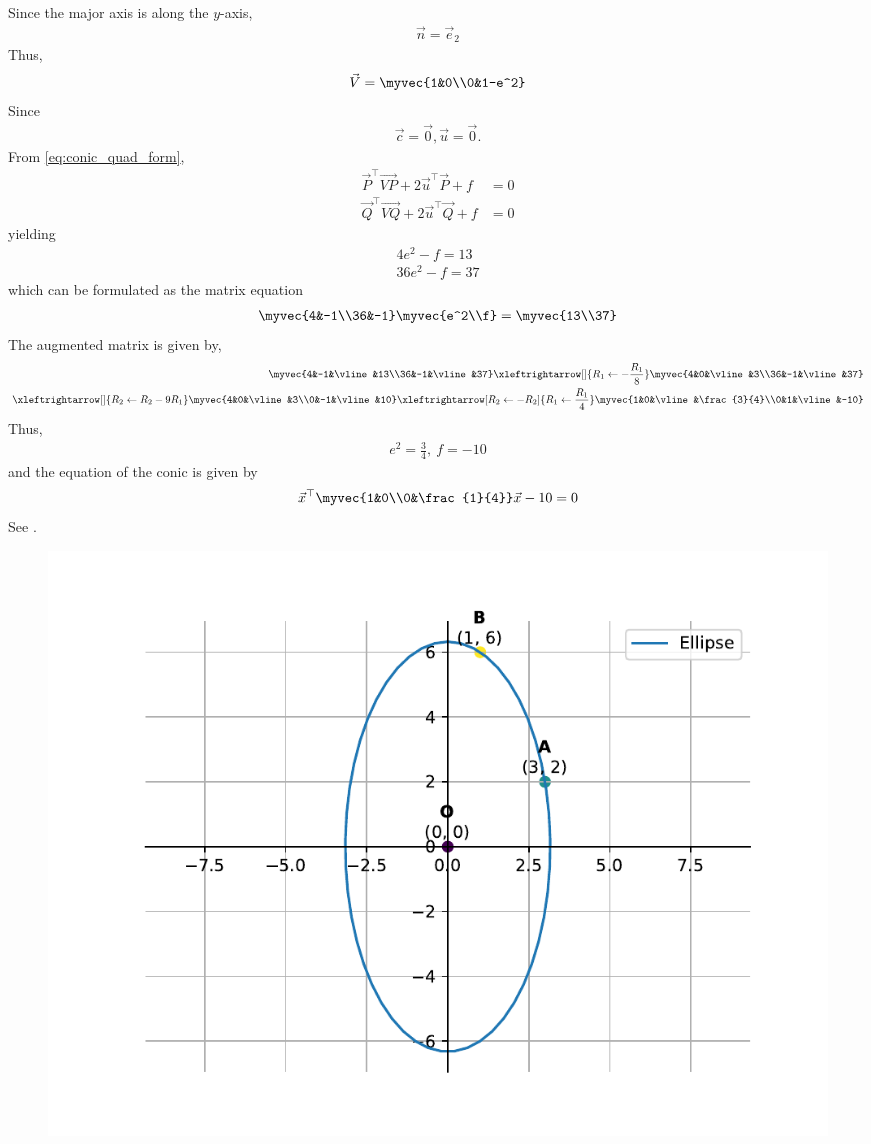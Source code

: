 Since the major axis is along the $y$-axis,
\begin{align}
\vec{n} = \vec{e}_2
\end{align}
Thus,
\begin{align}
\vec{V} = \myvec{1&0\\0&1-e^2} \label{eq:chapters/11/11/3/19/5} 
\end{align}
Since
\begin{align}
\vec{c} = \vec{0}, \vec{u}=\vec{0}.
\label{eq:chapters/11/11/3/19/8}
\end{align}
    From \eqref{eq:conic_quad_form},
    \begin{align}
        \vec{P}^\top\vec{VP} + 2\vec{u}^\top\vec{P} + f &= 0 \label{eq:chapters/11/11/3/19/ep1} \\
        \vec{Q}^\top\vec{VQ} + 2\vec{u}^\top\vec{Q} + f &= 0 \label{eq:chapters/11/11/3/19/ep2}
    \end{align}
    yielding
\begin{align}
4e^2 - f = 13 \label{eq:chapters/11/11/3/19/10}
\\
36e^2 - f = 37 \label{eq:chapters/11/11/3/19/11}
\end{align}
which can be formulated as the matrix equation
\begin{align}
\myvec{4&-1\\36&-1}\myvec{e^2\\f} = \myvec{13\\37}
\label{eq:chapters/11/11/3/19/12}
\end{align}
The augmented matrix is given by,
\begin{align*}
\myvec{4&-1&\vline&13\\36&-1&\vline&37}
\xleftrightarrow[]{R_1\leftarrow-\frac{R_1}{8}} \myvec{4&0&\vline&3\\36&-1&\vline&37} 
\\
\xleftrightarrow[]{R_2\leftarrow R_2-9R_1}
\myvec{4&0&\vline&3\\0&-1&\vline&10} 
\xleftrightarrow[R_2\leftarrow -R_2]{R_1\leftarrow \frac{R_1}{4}}
\myvec{1&0&\vline&\frac{3}{4}\\0&1&\vline&-10}
\end{align*}
Thus,
\begin{align}
e^2 = \frac{3}{4},\ f = -10
\end{align}
and the equation of the conic is given by
\begin{align}
\vec{x}^\top\myvec{1&0\\0&\frac{1}{4}}\vec{x} - 10 = 0
\end{align}
See  
.
\begin{figure}[H]
\centering
\includegraphics[width=0.75\columnwidth]{chapters/11/11/3/19/figs/fig.pdf}
\caption{}
\label{fig:chapters/11/11/3/19/1}
\end{figure}
